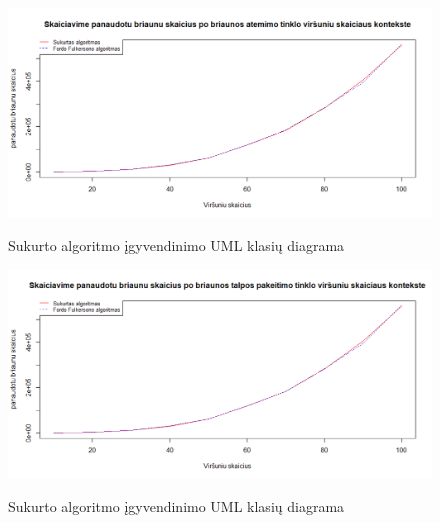 \begin{figure}[H]
	\caption{Sukurto algoritmo įgyvendinimo UML klasių diagrama}
	\centering
	\includegraphics[width=\textwidth]{img/vre.png}
	\label{plot:vre}
\end{figure}
\begin{figure}[H]
	\caption{Sukurto algoritmo įgyvendinimo UML klasių diagrama}
	\centering
	\includegraphics[width=\textwidth]{img/vue.png}
	\label{plot:vue}
\end{figure}

